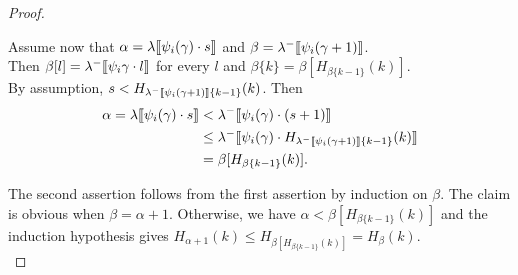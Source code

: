 \documentclass{amsart}
\theoremstyle{plain}
\theoremstyle{plain}
\def\scbrl{[\hspace{-.14em}[}
\def\scbrr{]\hspace{-.14em}]}
\def\scbr#1{\scbrl#1\scbrr}
\newcommand{\al}{{\alpha}}
\newcommand{\be}{{\beta}}
\newcommand{\ga}{\gamma}
\newcommand{\la}{\lambda}
\def\scbrl{[\hspace{-.14em}[}
\def\scbrr{]\hspace{-.14em}]}
\def\scbr#1{\scbrl#1\scbrr}
\begin{document}
\begin{proof}
\begin{Cases}
    \item 
    Assume now that $\al=\la\scbr{\psi_i(\ga)\cdot s}$ and $\be=\la^-\scbr{\psi_i(\ga+1)}$.\\
    Then $\be[l]= \la^-\scbr{\psi_i\ga \cdot l}$ for every $l$ and $\be\{k\}= \be[H_{\be\{k-1\}}(k)]$.\\
    By assumption, $s<H_{\la^-\scbr{\psi_i(\ga+1)}\{k-1\}}(k)$. Then
    \begin{align*}
        \al =\la\scbr{\psi_i(\ga)\cdot s} &< \la^-\scbr{\psi_i(\ga) \cdot (s+1)} \\
        &\leq \la^-\scbr{\psi_i(\ga) \cdot H_{\la^-\scbr{\psi_i(\ga+1)}\{k-1\}}(k)}\\
        &= \be[H_{\be\{k-1\}}(k)].
    \end{align*}
\end{Cases}
The second assertion follows from the first assertion by induction on $\be$.  The claim is obvious when $\be=\al+1$. Otherwise, we have $\al<\be[H_{\be\{k-1\}}(k)]$ and the induction hypothesis gives $H_{\al+1}(k)\leq H_{ \be[H_{\be\{k-1\}}(k)]} = H_\be(k)$.\medskip\\

\end{proof}
\end{document}
